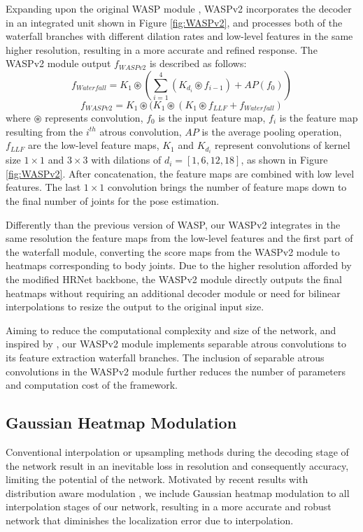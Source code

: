 \documentclass[10pt,twocolumn,letterpaper]{article}
\begin{document}
Expanding upon the original WASP module \cite{UniPose}, WASPv2 incorporates the decoder in an integrated unit shown in Figure \ref{fig:WASPv2}, and processes both of the waterfall branches with different dilation rates and low-level features in the same higher resolution, resulting in a more accurate and refined response.
The WASPv2 module output $f_{WASPv2}$ is described as follows:
\vspace{-0.1in}
\begin{equation}
    f_{Waterfall} = K_1\circledast(\sum_{i=1}^{4}(K_{d_i}\circledast f_{i-1})+AP(f_{0}))
\end{equation}
\begin{equation}   
    f_{WASPv2} = K_1\circledast(K_1\circledast(K_1\circledast f_{LLF} + f_{Waterfall})
\end{equation}
\noindent 
where $\circledast$ represents convolution, $f_{0}$ is the input feature map, $f_{i}$ is the feature map resulting from the $i^{th}$ atrous convolution, $AP$ is the average pooling operation, $f_{LLF}$ are the low-level feature maps, $K_1$ and $K_{d_i}$ represent convolutions of kernel size $1\times1$ and $3\times3$ with dilations of ${d_i}=[1,6,12,18]$, as shown in Figure \ref{fig:WASPv2}. 
After concatenation, the feature maps are combined with low level features.
The last $1\times1$ convolution brings the number of feature maps down to the final number of joints for the pose estimation.

Differently than the previous version of WASP, our WASPv2 integrates in the same resolution the feature maps from the low-level features and the first part of the waterfall module, converting the score maps from the WASPv2 module to heatmaps corresponding to body joints.
Due to the higher resolution afforded by the modified HRNet backbone, the WASPv2 module directly outputs the final heatmaps without requiring an additional decoder module or need for bilinear interpolations to resize the output to the original input size.

Aiming to reduce the computational complexity and size of the network,
and inspired by \cite{DeepLabv3+}, 
our WASPv2 module implements separable atrous convolutions to its feature extraction waterfall branches. The inclusion of separable atrous convolutions in the WASPv2 module further reduces the number of parameters and computation cost of the framework.

\subsection{Gaussian Heatmap Modulation}
Conventional interpolation or upsampling methods during the decoding stage of the network result in an inevitable loss in resolution and consequently accuracy, limiting the potential of the network.
Motivated by recent results 
with distribution aware modulation \cite{DarkPose}, we include Gaussian heatmap modulation to all interpolation stages of our network,
resulting in a more accurate and robust network that diminishes the
localization error due to interpolation.
\end{document}
